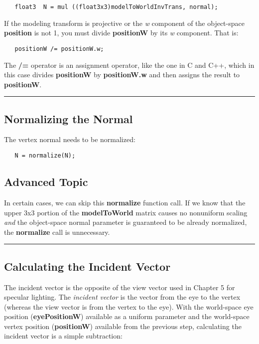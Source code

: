 \documentclass[../main.tex]{subfiles}
\begin{document}
\FloatBarrier
\begin{lstlisting}
   float3  N = mul ((float3x3)modelToWorldInvTrans, normal);
\end{lstlisting}
\FloatBarrier
   
If the modeling transform is projective or the \textit{w} component of the object-space \textbf{position} is not 1, you must divide \textbf{positionW} by its \textit{w} component. That is:

\FloatBarrier
\begin{lstlisting}
   positionW /= positionW.w;
\end{lstlisting}
\FloatBarrier

The \textbf{/=} operator is an assignment operator, like the one in C and C++, which in this case divides \textbf{positionW} by \textbf{positionW.w} and then assigns the result to \textbf{positionW}.
\hrule

\subsection*{Normalizing the Normal}

The vertex normal needs to be normalized:

\FloatBarrier
\begin{lstlisting}
   N = normalize(N);
\end{lstlisting}
\FloatBarrier

\subsection*{Advanced Topic}

In certain cases, we can skip this \textbf{normalize} function call. If we know that the upper 3x3 portion of the \textbf{modelToWorld} matrix causes no nonuniform scaling \textit{and} the object-space normal parameter is guaranteed to be already normalized, the \textbf{normalize} call is unnecessary.
\hrule

\subsection*{Calculating the Incident Vector}

The incident vector is the opposite of the view vector used in Chapter 5 for specular lighting. The \textit{incident vector} is the vector from the eye to the vertex (whereas the view vector is from the vertex to the eye). With the world-space eye position (\textbf{eyePositionW}) available as a uniform parameter and the world-space vertex position (\textbf{positionW}) available from the previous step, calculating the incident vector is a simple subtraction:
\end{document}
